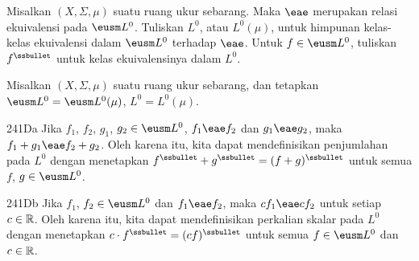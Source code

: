  Misalkan $(X,\Sigma,\mu)$ suatu
ruang ukur sebarang. Maka $\eae$ merupakan relasi ekuivalensi pada
$\eusm L^0$. Tuliskan $L^0$, atau $L^0(\mu)$, untuk himpunan kelas-kelas
ekuivalensi dalam $\eusm L^0$ terhadap $\eae$. Untuk $f\in\eusm L^0$,
tuliskan $f^{\ssbullet}$ untuk kelas ekuivalensinya dalam $L^0$.

 Misalkan $(X,\Sigma,\mu)$ suatu
ruang ukur sebarang, dan tetapkan $\eusm L^0=\eusm L^0(\mu)$,
$L^0=L^0(\mu)$.

\spheader 241Da Jika $f_1$, $f_2$, $g_1$, $g_2\in\eusm L^0$,
$f_1\eae f_2$ dan $g_1\eae g_2$, maka $f_1+g_1\eae f_2+g_2$. Oleh
karena itu, kita dapat mendefinisikan penjumlahan pada $L^0$ dengan
menetapkan $f^{\ssbullet}+g^{\ssbullet}=(f+g)^{\ssbullet}$ untuk semua
$f$, $g\in\eusm L^0$.

\spheader 241Db Jika $f_1$, $f_2\in\eusm L^0$ dan $f_1\eae f_2$,
maka $cf_1\eae cf_2$ untuk setiap $c\in\Bbb R$. Oleh karena itu, kita
dapat mendefinisikan perkalian skalar pada $L^0$ dengan menetapkan
$c\cdot f^{\ssbullet}=(cf)^{\ssbullet}$ untuk semua $f\in\eusm L^0$
dan $c\in\Bbb R$.


